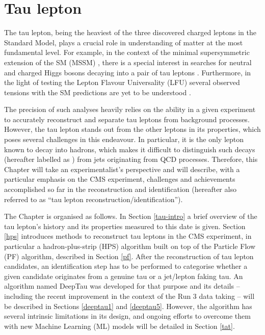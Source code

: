 \chapter{Tau lepton}\label{sec:tau}

The tau lepton, being the heaviest of the three discovered charged leptons in the Standard Model, plays a crucial role in understanding of matter at the most fundamental level. For example, in the context of the minimal supersymmetric extension of the SM (MSSM) \cite{Fayet:1974pd, Fayet:1977yc}, there is a special interest in searches for neutral and charged Higgs bosons decaying into a pair of tau leptons \cite{CMS:2022goy}. Furthermore, in the light of testing the Lepton Flavour Universality (LFU) several observed tensions with the SM predictions are yet to be understood \cite{HFLAV:2022pwe, Cheaib:2022ral, LHCb:2017vlu, LHCb:2021trn}. 

The precision of such analyses heavily relies on the ability in a given experiment to accurately reconstruct and separate tau leptons from background processes. However, the tau lepton stands out from the other leptons in its properties, which poses several challenges in this endeavour. In particular, it is the only lepton known to decay into hadrons, which makes it difficult to distinguish such decays (hereafter labelled as \tauh) from jets originating from QCD processes. Therefore, this Chapter will take an experimentalist’s perspective and will describe, with a particular emphasis on the CMS experiment, challenges and achievements accomplished so far in the \tauh reconstruction and identification (hereafter also referred to as \enquote{tau lepton reconstruction/identification}).

The Chapter is organised as follows. In Section \ref{tau-intro} a brief overview of the tau lepton’s history and its properties measured to this date is given. Section \ref{hps} introduces methods to reconstruct tau leptons in the CMS experiment, in particular a hadron-plus-strip (HPS) algorithm built on top of the Particle Flow (PF) algorithm, described in Section \ref{pf}. After the reconstruction of tau lepton candidates, an identification step has to be performed to categorise whether a given candidate originates from a genuine tau or a jet/lepton faking tau. An algorithm named DeepTau was developed for that purpose and its details -- including the recent improvement in the context of the Run 3 data taking -- will be described in Sections \ref{deeptau1} and \ref{deeptau5}. However, the algorithm has several intrinsic limitations in its design, and ongoing efforts to overcome them with new Machine Learning (ML) models will be detailed in Section \ref{tat}.

